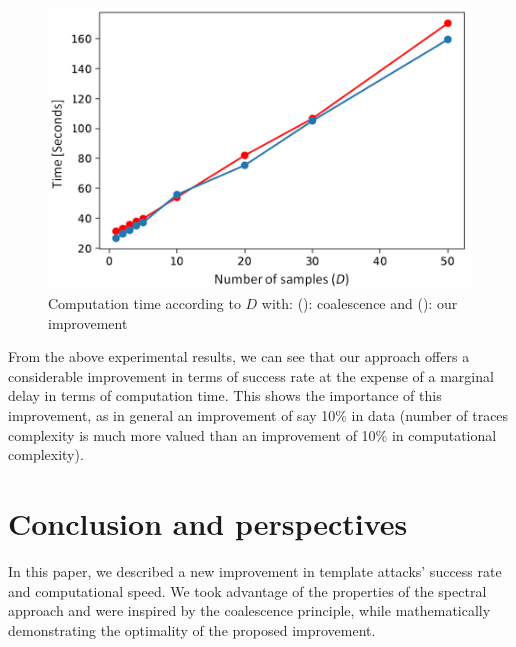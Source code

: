 \documentclass[conference,twocolumn]{IEEEtran}
\begin{document}
\begin{figure}[H]
\begin{center}
\includegraphics[width=1.0\linewidth]{Fig/temps_de_calcul.PNG}
\end{center}
\caption{Computation time according to $D$ with: ({\color{blue}{$\bullet$}}): coalescence and ({\color{red}{$\bullet$}}): our improvement}
\label{temps de calcul}
\end{figure}

 
From the above experimental results, we can see that our approach offers a considerable improvement in terms of success rate at the expense of a marginal delay in terms of computation time. 
This shows the importance of this improvement, as in general an improvement of say 10\% in data (number of traces complexity is much more valued than an improvement of 10\% in computational complexity).
   


\section{Conclusion and perspectives}\label{sec-conclusion}

In this paper, we described a new improvement in template attacks' success rate and computational speed.
We took advantage of the properties of the spectral approach and were inspired by the coalescence principle, while mathematically demonstrating the optimality of the proposed improvement.
\end{document}

